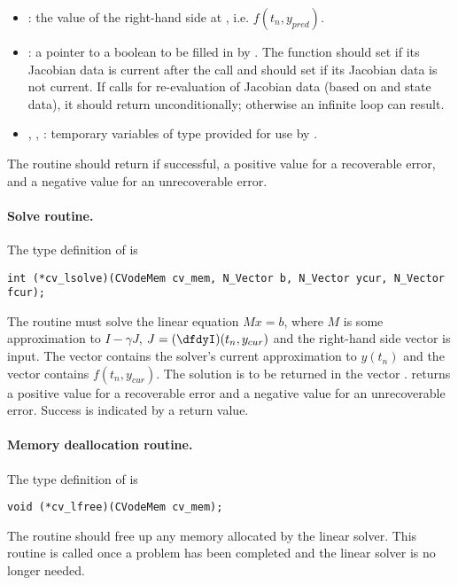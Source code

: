 \begin{itemize}
\item {}: the value of the right-hand side at , 
  i.e. $f(t_n, y_{pred})$.
  
\item {}: a pointer to a boolean to be filled in by .  
  The function should set  if its Jacobian 
  data is current after the call and should set         
   if its Jacobian data is not current.   
  If  calls for re-evaluation of         
  Jacobian data (based on  and {\cvodes} state      
  data), it should return  unconditionally;
  otherwise an infinite loop can result.                
  
\item {}, , : 
  temporary variables of type  provided for use by .      
  
\end{itemize}

The  routine should return  if successful,            
a positive value for a recoverable error, and a negative value  
for an unrecoverable error.  

\paragraph{Solve routine.}
The type definition of  is
\begin{verbatim}
int (*cv_lsolve)(CVodeMem cv_mem, N_Vector b, N_Vector ycur, N_Vector fcur);  
\end{verbatim}
The routine  must solve the linear equation $M x = b$, where         
$M$ is some approximation to $I - \gamma J$, $J = (\dfdyI)(t_n, y_{cur})$  
and the right-hand side vector  is input. The vector 
contains the solver's current approximation to $y(t_n)$ and the vector      
 contains $f(t_n,y_{cur})$. The solution is to be    
returned in the vector .  returns a positive value    
for a recoverable error and a negative value for an             
unrecoverable error. Success is indicated by a  return value.

\paragraph{Memory deallocation routine.}
The type definition of  is
\begin{verbatim}
void (*cv_lfree)(CVodeMem cv_mem);
\end{verbatim}
The routine  should free up any memory allocated by the linear
solver. This routine is called once a problem has been completed and the 
linear solver is no longer needed.
